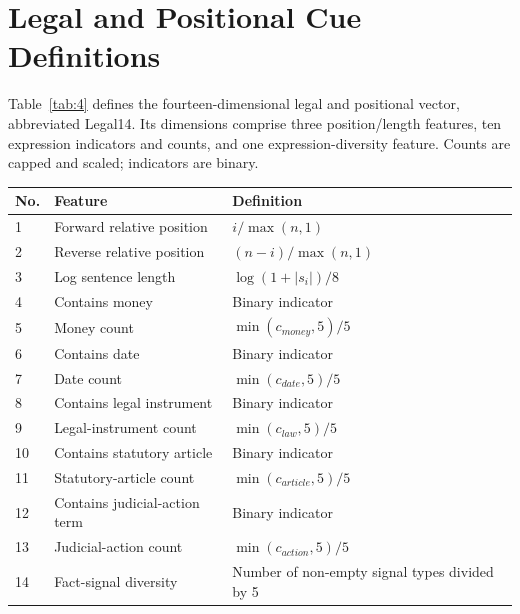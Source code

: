 \documentclass[10pt,twocolumn,letterpaper]{article}
\begin{document}
\par\medskip\noindent\begin{minipage}{\columnwidth}
\section{Legal and Positional Cue Definitions}\label{appendix-b-legal14-definitions}

Table~\ref{tab:4} defines the fourteen-dimensional legal and positional vector, abbreviated Legal14. Its dimensions comprise three position/length features, ten expression indicators and counts, and one expression-diversity feature. Counts are capped and scaled; indicators are binary.

\label{tab:4}
\begin{tabularx}{\columnwidth}{@{}l>{\raggedright\arraybackslash}X>{\raggedright\arraybackslash}X@{}}
\toprule
\textbf{No.} & \textbf{Feature} & \textbf{Definition} \\
\midrule
1 & Forward relative position & \(i/\max(n,1)\) \\
2 & Reverse relative position & \((n - i)/\max(n,1)\) \\
3 & Log sentence length & \(\log\left( 1 + \left| s_{i} \right| \right)/8\) \\
4 & Contains money & Binary indicator \\
5 & Money count & \(\min\left( c_{money},5 \right)/5\) \\
6 & Contains date & Binary indicator \\
7 & Date count & \(\min\left( c_{date},5 \right)/5\) \\
8 & Contains legal instrument & Binary indicator \\
9 & Legal-instrument count & \(\min\left( c_{law},5 \right)/5\) \\
10 & Contains statutory article & Binary indicator \\
11 & Statutory-article count & \(\min\left( c_{article},5 \right)/5\) \\
12 & Contains judicial-action term & Binary indicator \\
13 & Judicial-action count & \(\min\left( c_{action},5 \right)/5\) \\
14 & Fact-signal diversity & Number of non-empty signal types divided by 5 \\
\bottomrule
\end{tabularx}
\end{minipage}\par\smallskip
\end{document}
